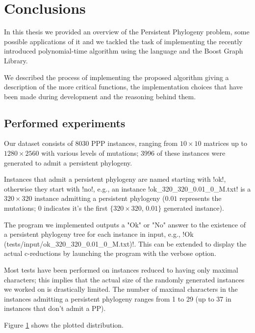 
\section{Conclusions}\label{section:conclusions}

In this thesis we provided an overview of the Persistent Phylogeny problem, some possible applications of it and we tackled the task of implementing the recently introduced polynomial-time algorithm \cite{PPPptime2016} using the \cc{} language and the Boost Graph Library.

We described the process of implementing the proposed algorithm giving a description of the more critical functions, the implementation choices that have been made during development and the reasoning behind them.

\subsection{Performed experiments}\label{section:experiments}

Our dataset consists of 8030 PPP instances, ranging from $10 \times 10$ matrices up to $1280 \times 2560$ with various levels of mutations; 3996 of these instances were generated to admit a persistent phylogeny.

Instances that admit a persistent phylogeny are named starting with !ok!, otherwise they start with !no!, e.g., an instance !ok_320_320_0.01_0_M.txt! is a $320 \times 320$ instance admitting a persistent phylogeny ($0.01$ represents the mutations; $0$ indicates it's the first $\{ 320 \times 320$, $0.01 \}$ generated instance).

The program we implemented outputs a "Ok" or "No" answer to the existence of a persistent phylogeny tree for each instance in input, e.g., !Ok (tests/input/ok_320_320_0.01_0_M.txt)!.
This can be extended to display the actual c-reductions by launching the program with the verbose option.

Most tests have been performed on instances reduced to having only maximal characters; this implies that the actual size of the randomly generated instances we worked on is drastically limited.
The number of maximal characters in the instances admitting a persistent phylogeny ranges from 1 to 29 (up to 37 in instances that don't admit a PP).

Figure \ref{figure:6} shows the plotted distribution.

\begin{figure}[hp]
  

  \caption{}\label{figure:6}
\end{figure}

